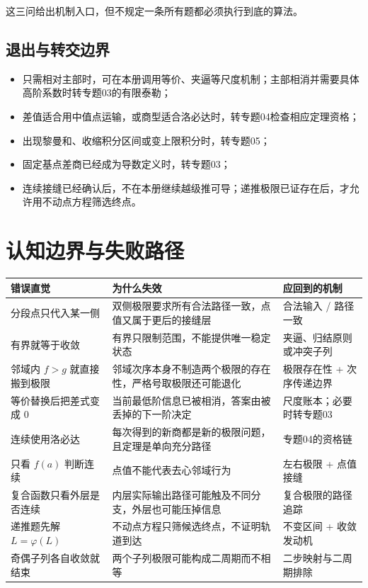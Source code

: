 \documentclass[11pt,a4paper]{ctexart}
\begin{document}
这三问给出机制入口，但不规定一条所有题都必须执行到底的算法。

\subsection{退出与转交边界}

\begin{itemize}
  \item 只需相对主部时，可在本册调用等价、夹逼等尺度机制；主部相消并需要具体高阶系数时转专题03的有限泰勒；
  \item 差值适合用中值点运输，或商型适合洛必达时，转专题04检查相应定理资格；
  \item 出现黎曼和、收缩积分区间或变上限积分时，转专题05；
  \item 固定基点差商已经成为导数定义时，转专题03；
  \item 连续接缝已经确认后，不在本册继续越级推可导；递推极限已证存在后，才允许用不动点方程筛选终点。
\end{itemize}

\section{认知边界与失败路径}

\begin{tabularx}{\linewidth}{L{3.2cm}YY}
\toprule
\textbf{错误直觉} & \textbf{为什么失效} & \textbf{应回到的机制}\\
\midrule
分段点只代入某一侧 & 双侧极限要求所有合法路径一致，点值又属于更后的接缝层 & 合法输入 / 路径一致\\
有界就等于收敛 & 有界只限制范围，不能提供唯一稳定状态 & 夹逼、归结原则或冲突子列\\
邻域内 $f>g$ 就直接搬到极限 & 邻域次序本身不制造两个极限的存在性，严格号取极限还可能退化 & 极限存在性 + 次序传递边界\\
等价替换后把差式变成 $0$ & 当前最低阶信息已被相消，答案由被丢掉的下一阶决定 & 尺度账本；必要时转专题03\\
连续使用洛必达 & 每次得到的新商都是新的极限问题，且定理是单向充分路径 & 专题04的资格链\\
只看 $f(a)$ 判断连续 & 点值不能代表去心邻域行为 & 左右极限 + 点值接缝\\
复合函数只看外层是否连续 & 内层实际输出路径可能触及不同分支，外层也可能压掉信息 & 复合极限的路径追踪\\
递推题先解 $L=\varphi(L)$ & 不动点方程只筛候选终点，不证明轨道到达 & 不变区间 + 收敛发动机\\
奇偶子列各自收敛就结束 & 两个子列极限可能构成二周期而不相等 & 二步映射与二周期排除\\
\bottomrule
\end{tabularx}
\end{document}
